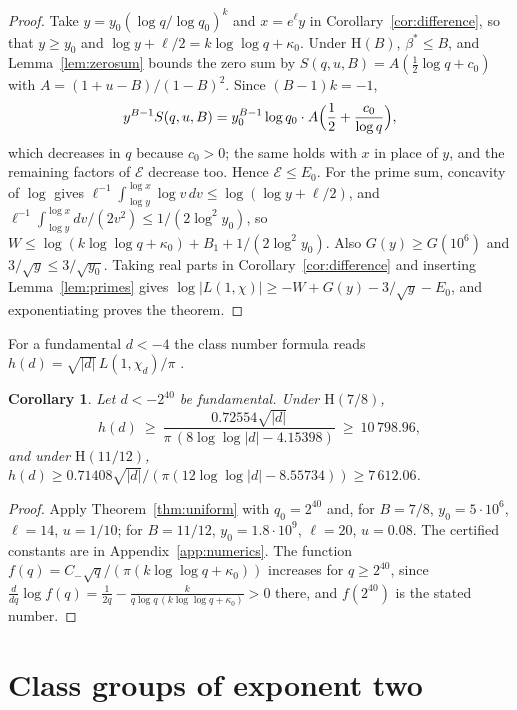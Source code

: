 \documentclass[11pt]{amsart}
\newtheorem{corollary}[theorem]{Corollary}
\theoremstyle{definition}
\theoremstyle{remark}
\numberwithin{equation}{section}
\newcommand{\Hyp}{\mathrm{H}}
\begin{document}
\begin{proof}
Take $y=y_0(\log q/\log q_0)^k$ and $x=e^\ell y$ in Corollary~\ref{cor:difference}, so that $y\ge y_0$ and $\log y+\ell/2=k\log\log q+\kappa_0$. Under $\Hyp(B)$, $\beta^*\le B$, and Lemma~\ref{lem:zerosum} bounds the zero sum by $S(q,u,B)=A(\frac12\log q+c_0)$ with $A=(1+u-B)/(1-B)^2$. Since $(B-1)k=-1$,
\[
y^{B-1}S(q,u,B)=y_0^{B-1}\log q_0\cdot A\Bigl(\frac12+\frac{c_0}{\log q}\Bigr),
\]
which decreases in $q$ because $c_0>0$; the same holds with $x$ in place of $y$, and the remaining factors of $\mathcal E$ decrease too. Hence $\mathcal E\le E_0$. For the prime sum, concavity of $\log$ gives $\ell^{-1}\int_{\log y}^{\log x}\log v\,dv\le\log(\log y+\ell/2)$, and $\ell^{-1}\int_{\log y}^{\log x}dv/(2v^2)\le1/(2\log^2y_0)$, so $W\le\log(k\log\log q+\kappa_0)+B_1+1/(2\log^2y_0)$. Also $G(y)\ge G(10^6)$ and $3/\sqrt y\le3/\sqrt{y_0}$. Taking real parts in Corollary~\ref{cor:difference} and inserting Lemma~\ref{lem:primes} gives $\log|L(1,\chi)|\ge-W+G(y)-3/\sqrt y-E_0$, and exponentiating proves the theorem.
\end{proof}

For a fundamental $d<-4$ the class number formula reads $h(d)=\sqrt{|d|}\,L(1,\chi_d)/\pi$ \cite[Chapter 6]{Dav80}.

\begin{corollary}\label{cor:h}
Let $d<-2^{40}$ be fundamental. Under $\Hyp(7/8)$,
\[
h(d)\ \ge\ \frac{0.72554\sqrt{|d|}}{\pi\,(8\log\log|d|-4.15398)}\ \ge\ 10\,798.96 ,
\]
and under $\Hyp(11/12)$, $h(d)\ge 0.71408\sqrt{|d|}/(\pi(12\log\log|d|-8.55734))\ge7\,612.06$.
\end{corollary}

\begin{proof}
Apply Theorem~\ref{thm:uniform} with $q_0=2^{40}$ and, for $B=7/8$, $y_0=5\cdot10^6$, $\ell=14$, $u=1/10$; for $B=11/12$, $y_0=1.8\cdot10^9$, $\ell=20$, $u=0.08$. The certified constants are in Appendix~\ref{app:numerics}. The function $f(q)=C_-\sqrt q/(\pi(k\log\log q+\kappa_0))$ increases for $q\ge2^{40}$, since $\frac{d}{dq}\log f(q)=\frac1{2q}-\frac{k}{q\log q\,(k\log\log q+\kappa_0)}>0$ there, and $f(2^{40})$ is the stated number.
\end{proof}

\section{Class groups of exponent two}\label{sec:two}
\end{document}
